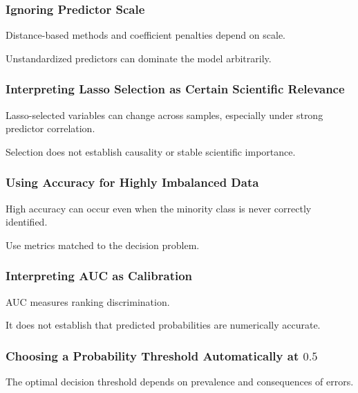 \subsubsection{Ignoring Predictor Scale}

Distance-based methods and coefficient penalties depend on scale.

Unstandardized predictors can dominate the model arbitrarily.

\subsubsection{Interpreting Lasso Selection as Certain Scientific Relevance}

Lasso-selected variables can change across samples, especially under
strong predictor correlation.

Selection does not establish causality or stable scientific importance.

\subsubsection{Using Accuracy for Highly Imbalanced Data}

High accuracy can occur even when the minority class is never correctly
identified.

Use metrics matched to the decision problem.

\subsubsection{Interpreting AUC as Calibration}

AUC measures ranking discrimination.

It does not establish that predicted probabilities are numerically
accurate.

\subsubsection{Choosing a Probability Threshold Automatically at \(0.5\)}

The optimal decision threshold depends on prevalence and consequences of
errors.

